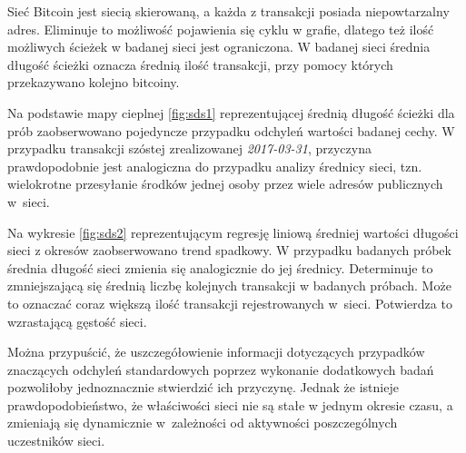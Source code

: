 \documentclass[12pt, twoside, final, openany]{mgr}
\begin{document}
\indent Sieć Bitcoin jest siecią skierowaną, a każda z transakcji posiada niepowtarzalny adres. Eliminuje to możliwość pojawienia się cyklu w grafie, dlatego też ilość możliwych ścieżek w badanej sieci jest ograniczona. W badanej sieci średnia długość ścieżki oznacza średnią ilość transakcji, przy pomocy których przekazywano kolejno bitcoiny.

\indent Na podstawie mapy cieplnej \ref{fig:sds1} reprezentującej średnią długość ścieżki dla prób zaobserwowano pojedyncze przypadku odchyleń wartości badanej cechy. W przypadku transakcji szóstej zrealizowanej \textit{2017-03-31}, przyczyna prawdopodobnie jest analogiczna do przypadku analizy średnicy sieci, tzn. wielokrotne przesyłanie środków jednej osoby przez wiele adresów publicznych w~sieci.

\indent Na wykresie \ref{fig:sds2} reprezentującym regresję liniową średniej wartości długości sieci z okresów zaobserwowano trend spadkowy. W przypadku badanych próbek średnia długość sieci zmienia się analogicznie do jej średnicy. Determinuje to zmniejszającą się średnią liczbę kolejnych transakcji w badanych próbach. Może to oznaczać coraz większą ilość transakcji rejestrowanych w~sieci. Potwierdza to wzrastającą gęstość sieci.

\indent Można przypuścić, że uszczegółowienie informacji dotyczących przypadków znaczących odchyleń standardowych poprzez wykonanie dodatkowych badań pozwoliłoby jednoznacznie stwierdzić ich przyczynę. Jednak że istnieje prawdopodobieństwo, że właściwości sieci nie są stałe w jednym okresie czasu, a zmieniają się dynamicznie w~zależności od aktywności poszczególnych uczestników sieci.
\end{document}

